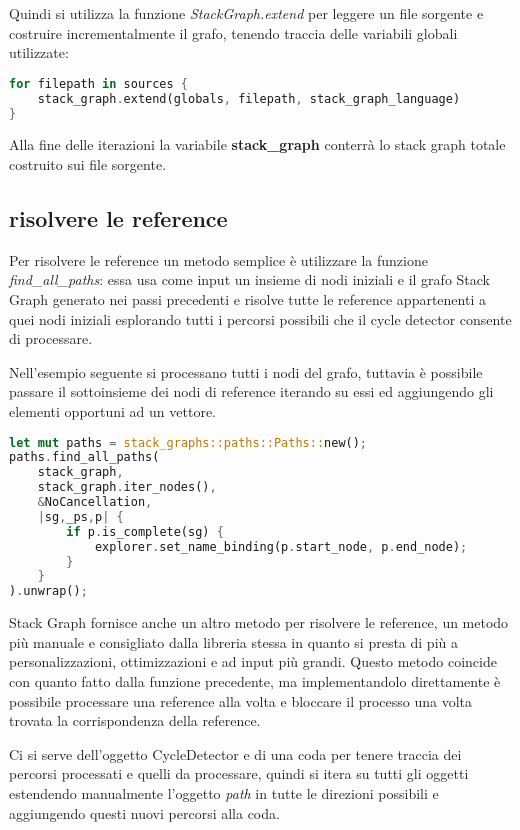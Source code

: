 Quindi si utilizza la funzione \emph{StackGraph.extend} per leggere un file sorgente e costruire incrementalmente il grafo, tenendo traccia delle variabili globali utilizzate:

\begin{lstlisting}[language=Rust]
for filepath in sources {
    stack_graph.extend(globals, filepath, stack_graph_language)
}
\end{lstlisting}

Alla fine delle iterazioni la variabile \textbf{stack\_graph} conterr\`a lo stack graph totale costruito sui file sorgente.

\subsection{risolvere le reference}

Per risolvere le reference un metodo semplice \`e utilizzare la funzione \emph{find\_all\_paths}: essa usa come input un insieme di nodi iniziali e il grafo Stack Graph generato nei passi precedenti e risolve tutte le reference appartenenti a quei nodi iniziali esplorando tutti i percorsi possibili che il cycle detector consente di processare.

Nell'esempio seguente si processano tutti i nodi del grafo, tuttavia \`e possibile passare il sottoinsieme dei nodi di reference iterando su essi ed aggiungendo gli elementi opportuni ad un vettore.

\begin{lstlisting}[language=Rust]
let mut paths = stack_graphs::paths::Paths::new();
paths.find_all_paths(
    stack_graph,
    stack_graph.iter_nodes(),
    &NoCancellation,
    |sg,_ps,p| {
        if p.is_complete(sg) {
            explorer.set_name_binding(p.start_node, p.end_node);
        }
    }
).unwrap();
\end{lstlisting}

Stack Graph fornisce anche un altro metodo per risolvere le reference, un metodo pi\`u manuale e consigliato dalla libreria stessa in quanto si presta di pi\`u a personalizzazioni, ottimizzazioni e ad input pi\`u grandi.
Questo metodo coincide con quanto fatto dalla funzione precedente, ma implementandolo direttamente \`e possibile processare una reference alla volta e bloccare il processo una volta trovata la corrispondenza della reference.

Ci si serve dell'oggetto CycleDetector e di una coda per tenere traccia dei percorsi processati e quelli da processare, quindi si itera su tutti gli oggetti estendendo manualmente l'oggetto \emph{path} in tutte le direzioni possibili e aggiungendo questi nuovi percorsi alla coda.

